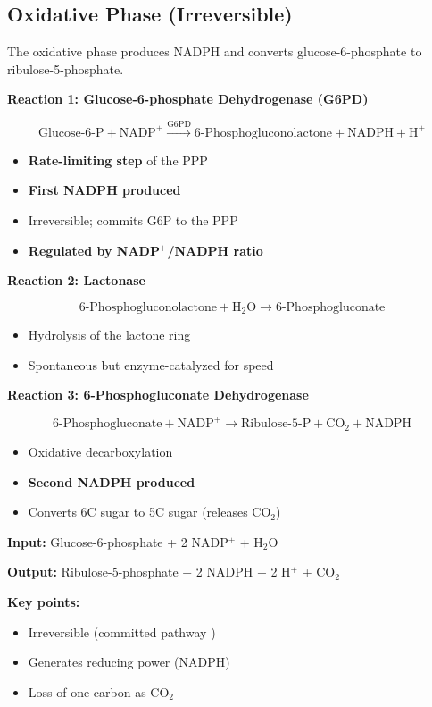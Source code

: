 \subsection{Oxidative Phase (Irreversible)}

The oxidative phase produces NADPH and converts glucose-6-phosphate to ribulose-5-phosphate.

\textbf{Reaction 1: Glucose-6-phosphate Dehydrogenase (G6PD)}

\[
\text{Glucose-6-P} + \text{NADP}^+ \xrightarrow{\text{G6PD}} \text{6-Phosphogluconolactone} + \text{NADPH} + \text{H}^+
\]

\begin{itemize}
    \item \textbf{Rate-limiting step} of the PPP
    \item \textbf{First NADPH produced}
    \item Irreversible; commits G6P to the PPP
    \item \textbf{Regulated by NADP$^+$/NADPH ratio}
\end{itemize}

\textbf{Reaction 2: Lactonase}

\[
\text{6-Phosphogluconolactone} + \text{H}_2\text{O} \rightarrow \text{6-Phosphogluconate}
\]

\begin{itemize}
    \item Hydrolysis of the lactone ring
    \item Spontaneous but enzyme-catalyzed for speed
\end{itemize}

\textbf{Reaction 3: 6-Phosphogluconate Dehydrogenase}

\[
\text{6-Phosphogluconate} + \text{NADP}^+ \rightarrow \text{Ribulose-5-P} + \text{CO}_2 + \text{NADPH}
\]

\begin{itemize}
    \item Oxidative decarboxylation
    \item \textbf{Second NADPH produced}
    \item Converts 6C sugar to 5C sugar (releases CO$_2$)
\end{itemize}

\begin{tcolorbox}[colback=blue!5, colframe=blue!70!black, title=\textbf{Oxidative Phase Summary}]
\textbf{Input:} Glucose-6-phosphate + 2 NADP$^+$ + H$_2$O

\textbf{Output:} Ribulose-5-phosphate + 2 NADPH + 2 H$^+$ + CO$_2$

\textbf{Key points:}
\begin{itemize}
    \item Irreversible (committed pathway
)
    \item Generates reducing power (NADPH)
    \item Loss of one carbon as CO$_2$
\end{itemize}
\end{tcolorbox}

